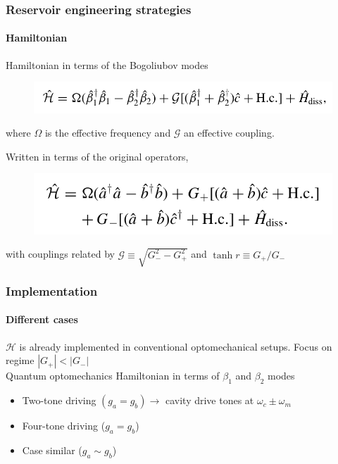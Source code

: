 \documentclass[aspectratio=43]{beamer}
\begin{document}
\begin{frame}
	
	\frametitle{Reservoir engineering strategies}
	\framesubtitle{Hamiltonian}
	
	Hamiltonian in terms of the Bogoliubov modes
	\begin{figure}
		\includegraphics[width = 8.5 cm]{plots/hamiltonian_3.png}
	\end{figure}	
	
	where $\Omega$ is the effective frequency and $\mathcal{G}$ an effective coupling.
	
	Written in terms of the original operators,
	\begin{figure}
		\includegraphics[width = 7.5 cm]{plots/hamiltonian_4.png}
	\end{figure}

	with couplings related by $\mathcal{G} \equiv \sqrt{G_{-}^{2} - G_{+}^{2}}$ and $\tanh r \equiv G_{+}/G_{-}$

\end{frame}

\begin{frame}

	\frametitle{Implementation}
	\framesubtitle{Different cases}
	
		$\mathcal{H}$ is already implemented in conventional optomechanical setups. Focus on regime $|G_{+}|<|G_{-}|$\\
		Quantum optomechanics Hamiltonian in terms of $\beta_{1}$ and $\beta_{2}$ modes

	\begin{itemize}
		\item Two-tone driving $(g_{a} = g_{b}) \longrightarrow$ cavity drive tones at $\omega_{c} \pm \omega_{m}$ 
		\item Four-tone driving ($g_{a} = g_{b}$)
		\item Case similar ($g_{a} \sim g_{b}$)
	\end{itemize}	

\end{frame}
\end{document}
